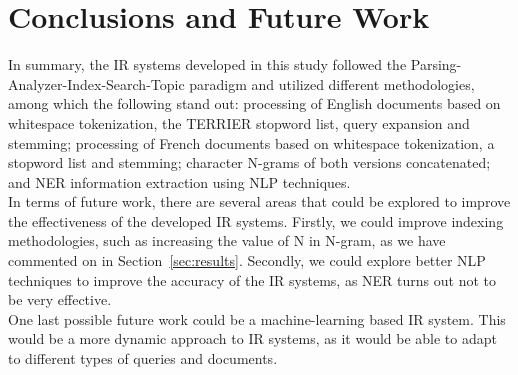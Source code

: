 \section{Conclusions and Future Work}
\label{sec:conclusion}

In summary, the IR systems developed in this study followed the Parsing-Analyzer-Index-Search-Topic paradigm and utilized different methodologies, among which the following stand out: processing of English documents based on whitespace tokenization, the TERRIER stopword list, query expansion and stemming; processing of French documents based on whitespace tokenization, a stopword list and stemming; character N-grams of both versions concatenated; and NER information extraction using NLP techniques.\\

In terms of future work, there are several areas that could be explored to improve the effectiveness of the developed IR systems. Firstly, we could improve indexing methodologies, such as increasing the value of N in N-gram, as we have commented on in Section~\ref{sec:results}. Secondly, we could explore better NLP techniques to improve the accuracy of the IR systems, as NER turns out not to be very effective.\\

One last possible future work could be a machine-learning based IR system. This would be a more dynamic approach to IR systems, as it would be able to adapt to different types of queries and documents.

